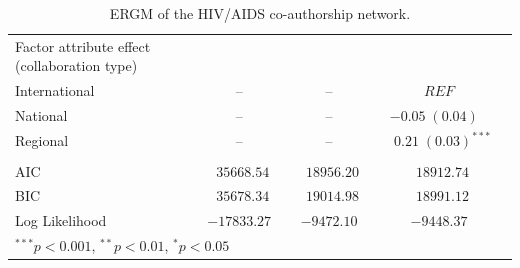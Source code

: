 \begin{table}
\begin{center}
\begin{tabular}{@{}lcclclcl@{}}
Factor attribute effect (collaboration type) &  &    &  &  &   &   \\
\hspace{10pt}International   &  & --   &  & --   &  & $REF$\\
\hspace{10pt}National        & &  --   &  &  -- & & $-0.05 \; (0.04)^{~~~~}$       \\
\hspace{10pt}Regional        & &  --   &  & --  & & $\hspace{6pt}0.21 \; (0.03)^{***}$  \\ \\
\midrule
AIC     & & $\hspace{6pt}35668.54$ &  & $\hspace{6pt}18956.20$   & & $\hspace{6pt}18912.74$   \\
BIC     & & $\hspace{6pt}35678.34$ &  & $\hspace{6pt}19014.98$   & & $\hspace{6pt}18991.12$  \\
Log Likelihood               & & $-17833.27$ & & $-9472.10$   & & $-9448.37$   \\
\bottomrule
\multicolumn{4}{l}{\scriptsize{$^{***}p<0.001$, $^{**}p<0.01$, $^*p<0.05$}}
\end{tabular}
\caption{ERGM of the HIV/AIDS co-authorship network.}
\label{tab:hiv_ergm}
\end{center}
\end{table}

